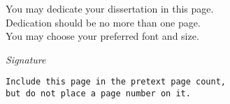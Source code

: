 \begin{flushleft}
You may dedicate your dissertation in this page.\\
Dedication should be no more than one page.\\
You may choose your preferred font and size.\\
\end{flushleft}
\vspace{110mm}
\begin{flushright}
\textit{Signature}
\end{flushright}
\vspace{20mm}
\begin{center}
\texttt{Include this page in the pretext page count,\\ but do not place a page number on it.}
\end{center}